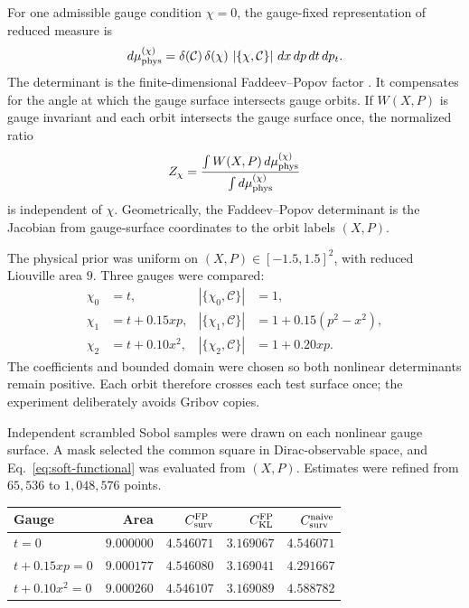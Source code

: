\documentclass[10pt]{article}
\begin{document}
For one admissible gauge condition $\chi=0$, the gauge-fixed representation of
reduced measure is
\begin{equation}
d\mu_{\rm phys}^{(\chi)}
=\delta(\mathcal C)\,\delta(\chi)\,
\left|\{\chi,\mathcal C\}\right|
\,dx\,dp\,dt\,dp_t.
\label{eq:fp-measure}
\end{equation}
The determinant is the finite-dimensional Faddeev--Popov factor
\citep{FaddeevPopov1967}.  It compensates for the angle at which the gauge
surface intersects gauge orbits.  If $W(X,P)$ is gauge invariant and each
orbit intersects the gauge surface once, the normalized ratio
\begin{equation}
Z_\chi
=\frac{\int W(X,P)\,d\mu_{\rm phys}^{(\chi)}}
       {\int d\mu_{\rm phys}^{(\chi)}}
\label{eq:gauge-ratio}
\end{equation}
is independent of $\chi$.  Geometrically, the Faddeev--Popov determinant is
the Jacobian from gauge-surface coordinates to the orbit labels $(X,P)$.

The physical prior was uniform on $(X,P)\in[-1.5,1.5]^2$, with reduced
Liouville area $9$.  Three gauges were compared:
\begin{align}
\chi_0&=t, & |\{\chi_0,\mathcal C\}|&=1,\nonumber\\
\chi_1&=t+0.15xp,
& |\{\chi_1,\mathcal C\}|&=1+0.15(p^2-x^2),\nonumber\\
\chi_2&=t+0.10x^2,
& |\{\chi_2,\mathcal C\}|&=1+0.20xp.
\label{eq:test-gauges}
\end{align}
The coefficients and bounded domain were chosen so both nonlinear determinants
remain positive.  Each orbit therefore crosses each test surface once; the
experiment deliberately avoids Gribov copies.

Independent scrambled Sobol samples were drawn on each nonlinear gauge
surface.  A mask selected the common square in Dirac-observable space, and
Eq.~\eqref{eq:soft-functional} was evaluated from $(X,P)$.  Estimates were
refined from $65{,}536$ to $1{,}048{,}576$ points.

\begin{center}
\label{tab:gauge-test}
\small
\begin{tabular}{lrrrr}
\toprule
Gauge & Area & $C_{\rm surv}^{\rm FP}$ & $C_{\rm KL}^{\rm FP}$ & $C_{\rm surv}^{\rm naive}$\\
\midrule
$t=0$ & $9.000000$ & $4.546071$ & $3.169067$ & $4.546071$\\
$t+0.15xp=0$ & $9.000177$ & $4.546080$ & $3.169041$ & $4.291667$\\
$t+0.10x^2=0$ & $9.000260$ & $4.546107$ & $3.169089$ & $4.588782$\\
\bottomrule
\end{tabular}
\end{center}
\end{document}
